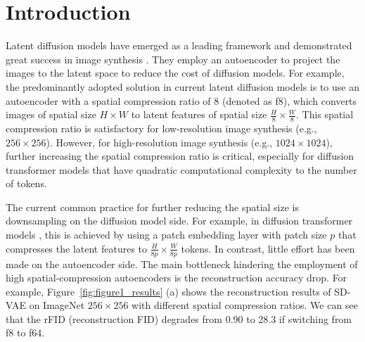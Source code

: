 \section{Introduction}
\label{sec:intro}

Latent diffusion models \citep{rombach2022high} have emerged as a leading framework and demonstrated great success in image synthesis \citep{flux2024,esser2024scaling}. They employ an autoencoder to project the images to the latent space to reduce the cost of diffusion models. For example, the predominantly adopted solution in current latent diffusion models \citep{rombach2022high,flux2024,esser2024scaling,chenpixart,chen2024pixart} is to use an autoencoder with a spatial compression ratio of 8 (denoted as f8), which converts 
images of spatial size $H\times W$ to latent features of spatial size $\frac{H}{8} \times \frac{W}{8}$. This spatial compression ratio is satisfactory for low-resolution image synthesis (e.g., $256 \times 256$). However, for high-resolution image synthesis (e.g., $1024 \times 1024$), further increasing the spatial compression ratio is critical, especially for diffusion transformer models \citep{peebles2023scalable, bao2023all} that have quadratic computational complexity to the number of tokens.

The current common practice for further reducing the spatial size is downsampling on the diffusion model side. For example, in diffusion transformer models \citep{peebles2023scalable, bao2023all}, this is achieved by using a patch embedding layer with patch size $p$ that compresses the latent features to $\frac{H}{8p} \times \frac{W}{8p}$ tokens. In contrast, little effort has been made on the autoencoder side. The main bottleneck hindering the employment of high spatial-compression autoencoders is the reconstruction accuracy drop. For example, Figure~\ref{fig:figure1_results} (a) shows the reconstruction results of SD-VAE \citep{rombach2022high} on ImageNet $256 \times 256$ with different spatial compression ratios. We can see that the rFID (reconstruction FID) degrades from 0.90 to 28.3 if switching from f8 to f64. 

